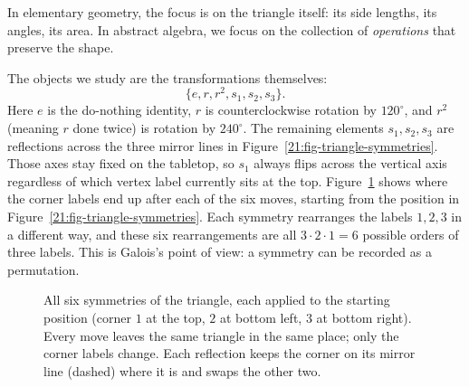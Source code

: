 In elementary geometry, the focus is on the triangle itself: its side lengths, its angles, its area. In abstract algebra, we focus on the collection of \emph{operations} that preserve the shape.

The objects we study are the transformations themselves:
\[
\{e, r, r^2, s_1, s_2, s_3\}.
\]
Here $e$ is the do-nothing identity, $r$ is counterclockwise rotation by $120^\circ$, and $r^2$ (meaning $r$ done twice) is rotation by $240^\circ$. The remaining elements $s_1, s_2, s_3$ are reflections across the three mirror lines in Figure~\ref{21:fig-triangle-symmetries}. Those axes stay fixed on the tabletop, so $s_1$ always flips across the vertical axis regardless of which vertex label currently sits at the top. Figure~\ref{21:fig-six-symmetries} shows where the corner labels end up after each of the six moves, starting from the position in Figure~\ref{21:fig-triangle-symmetries}. Each symmetry rearranges the labels $1, 2, 3$ in a different way, and these six rearrangements are all $3 \cdot 2 \cdot 1 = 6$ possible orders of three labels. This is Galois's point of view: a symmetry can be recorded as a permutation.

\begin{figure}[htbp]
\centering
{}
\caption{All six symmetries of the triangle, each applied to the starting position (corner $1$ at the top, $2$ at bottom left, $3$ at bottom right). Every move leaves the same triangle in the same place; only the corner labels change. Each reflection keeps the corner on its mirror line (dashed) where it is and swaps the other two.}\label{21:fig-six-symmetries}
\end{figure}

